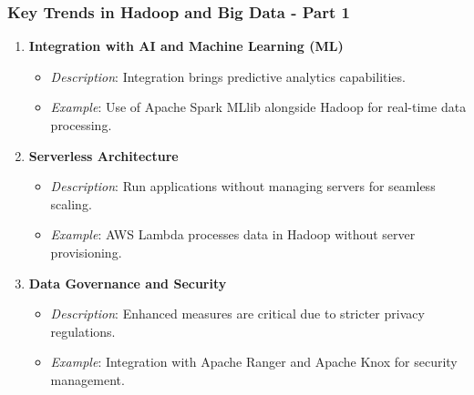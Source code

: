 \documentclass[aspectratio=169]{beamer}
\begin{document}
\begin{frame}[fragile]
    \frametitle{Key Trends in Hadoop and Big Data - Part 1}
    \begin{enumerate}
        \item \textbf{Integration with AI and Machine Learning (ML)}
        \begin{itemize}
            \item \textit{Description}: Integration brings predictive analytics capabilities.
            \item \textit{Example}: Use of Apache Spark MLlib alongside Hadoop for real-time data processing.
        \end{itemize}
        
        \item \textbf{Serverless Architecture}
        \begin{itemize}
            \item \textit{Description}: Run applications without managing servers for seamless scaling.
            \item \textit{Example}: AWS Lambda processes data in Hadoop without server provisioning.
        \end{itemize}

        \item \textbf{Data Governance and Security}
        \begin{itemize}
            \item \textit{Description}: Enhanced measures are critical due to stricter privacy regulations.
            \item \textit{Example}: Integration with Apache Ranger and Apache Knox for security management.
        \end{itemize}
    \end{enumerate}
\end{frame}
\end{document}
